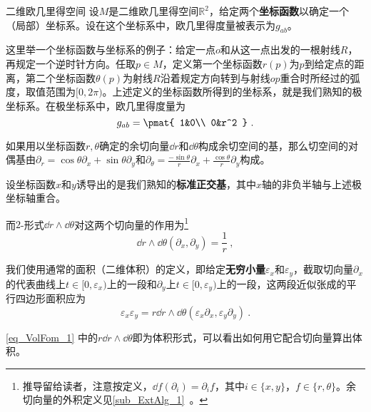 \begin{example}{二维欧几里得空间}\label{ex_VolFom_1}
设$M$是二维欧几里得空间$\mathbb{R}^2$，给定两个\textbf{坐标函数}以确定一个（局部）坐标系。设在这个坐标系中，欧几里得度量被表示为$g_{ab}$。

这里举一个坐标函数与坐标系的例子：给定一点$o$和从这一点出发的一根射线$R$，再规定一个逆时针方向。任取$p\in M$，定义第一个坐标函数$r(p)$为$p$到给定点的距离，第二个坐标函数$\theta(p)$为射线$R$沿着规定方向转到与射线$op$重合时所经过的弧度，取值范围为$[0, 2\pi)$。上述定义的坐标函数所得到的坐标系，就是我们熟知的极坐标系。在极坐标系中，欧几里得度量为
\begin{equation}
g_{ab}=\pmat{
    1&0\\
    0&r^2
}~.
\end{equation}


如果用以坐标函数$r, \theta$确定的余切向量$\dd r$和$\dd \theta$构成余切空间的基，那么切空间的对偶基由$\partial_r=\cos\theta\partial_x+\sin\theta\partial_y$和$\partial_\theta=\frac{-\sin\theta}{r}\partial_x+\frac{\cos\theta}{r}\partial_y$构成。



设坐标函数$x$和$y$诱导出的是我们熟知的\textbf{标准正交基}，其中$x$轴的非负半轴与上述极坐标轴重合。





而$2$-形式$\dd r\wedge\dd \theta$对这两个切向量的作用为\footnote{推导留给读者，注意按定义，$\dd f(\partial_i)=\partial_i f$，其中$i\in\{x, y\}$，$f\in\{r, \theta\}$。余切向量的外积定义见\autoref{sub_ExtAlg_1}~。}
\begin{equation}
\dd r\wedge\dd \theta(\partial_x, \partial_y) = \frac{1}{r}~,
\end{equation}

我们使用通常的面积（二维体积）的定义，即给定\textbf{无穷小量}$\varepsilon_x$和$\varepsilon_y$，截取切向量$\partial_x$的代表曲线上$t\in[0, \varepsilon_x)$上的一段和$\partial_y$上$t\in[0, \varepsilon_y)$上的一段，这两段近似张成的平行四边形面积应为
\begin{equation}\label{eq_VolFom_1}
\varepsilon_x\varepsilon_y = r\dd r\wedge\dd \theta(\varepsilon_x\partial_x, \varepsilon_y\partial_y)~.
\end{equation}


\autoref{eq_VolFom_1} 中的$r\dd r\wedge\dd \theta$即为体积形式，可以看出如何用它配合切向量算出体积。


\end{example}



